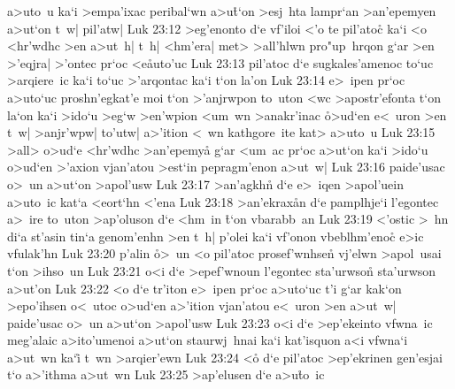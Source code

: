 a>uto~u
ka`i
>empa'ixac
peribal`wn
a>u\r{t}`on
>esj~hta
lampr`an
>an'epemyen
a>ut`on
t~w|
pil'atw|\bibvsend
\vs Luk 23:12
>eg'enonto
d`e
vf'iloi
<'o
te
pil'atoc\r{}
ka`i
<o
<hr'wdhc
>en
a>ut~h|
t~h|
<hm'era|
met>
>all'hlwn
pro"up~hrqon
g`ar
>en
>'eqjra|
>'ontec
pr`oc
<e\r{a}uto'uc\bibvsend
{}
\vs Luk 23:13
pil'atoc
d`e
sugkales'amenoc
to`uc
>arqiere~ic
ka`i
to`uc
>'arqontac
ka`i
t`on
la'on\bibvsend
\vs Luk 23:14
e>~ipen
pr`oc
a>uto`uc
proshn'egkat'e
moi
t`on
>'anjrwpon
to~uton
<wc
>apostr'efonta
t`on
la`on
ka`i
>ido`u
>eg`w
>en'wpion
<um~wn
>anakr'inac
\r{o}>ud`en
e<~uron
>en
t~w|
>anjr'wpw|
to'utw|
a>'ition
<~wn
kathgore~ite
kat>
a>uto~u\bibvsend
\vs Luk 23:15
>all>
o>ud`e
<hr'wdhc
>an'epemya\r{}
g`ar
<um~ac
pr`oc
a>ut`on
ka`i
>ido`u
o>ud`en
>'axion
vjan'atou
>est`in
pepragm'enon
a>ut~w|\bibvsend
\vs Luk 23:16
paide'usac
o>~un
a>ut`on
>apol'usw\bibvsend
\vs Luk 23:17
>an'agkhn\r{}
d`e
e>~iqen
>apol'uein
a>uto~ic
kat`a
<eort`hn
<'ena\bibvsend
\vs Luk 23:18
>an'ekrax\r{a}n
d`e
pamplhje`i
l'egontec
a>~ire
to~uton
>ap'oluson
d`e
<hm~in
\r{t}`on
vbarabb~an\bibvsend
\vs Luk 23:19
<'ostic
>~hn
di`a
st'asin
tin`a
genom'enhn
>en
t~h|
p'olei
ka`i
vf'onon
vbeblhm'enoc\r{}
e>ic
vfulak'hn\bibvsend
\vs Luk 23:20
p'alin
\r{o}>~un
<o
pil'atoc
prosef'wnhse\r{n}
vj'elwn
>apol~usai
t`on
>ihso~un\bibvsend
\vs Luk 23:21
o<i
d`e
>epef'wnoun
l'egontec
sta'urwson\r{}
sta'urwson
a>ut'on\bibvsend
\vs Luk 23:22
<o
d`e
tr'iton
e>~ipen
pr`oc
a>uto`uc
t'i
g`ar
kak`on
>epo'ihsen
o<~utoc
o>ud`en
a>'ition
vjan'atou
e<~uron
>en
a>ut~w|
paide'usac
o>~un
a>ut`on
>apol'usw\bibvsend
\vs Luk 23:23
o<i
d`e
>ep'ekeinto
vfwna~ic
meg'alaic
a>ito'umenoi
a>ut`on
staurwj~hnai
ka`i
kat'isquon
a<i
vfwna`i
a>ut~wn
ka`i\r{}
t~wn
>arqier'ewn\bibvsend
\vs Luk 23:24
<o\r{}
d`e
pil'atoc
>ep'ekrinen
gen'esjai
t`o
a>'ithma
a>ut~wn\bibvsend
\vs Luk 23:25
>ap'elusen
d`e
a>u\r{t}o~ic
